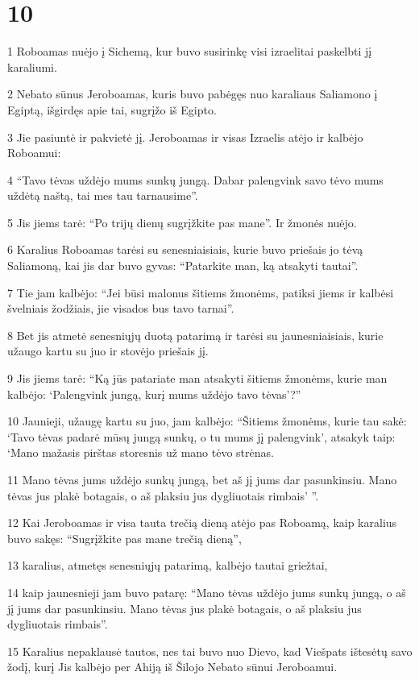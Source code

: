 \chapter{10}


\par 1 Roboamas nuėjo į Sichemą, kur buvo susirinkę visi izraelitai paskelbti jį karaliumi. 
\par 2 Nebato sūnus Jeroboamas, kuris buvo pabėgęs nuo karaliaus Saliamono į Egiptą, išgirdęs apie tai, sugrįžo iš Egipto. 
\par 3 Jie pasiuntė ir pakvietė jį. Jeroboamas ir visas Izraelis atėjo ir kalbėjo Roboamui: 
\par 4 “Tavo tėvas uždėjo mums sunkų jungą. Dabar palengvink savo tėvo mums uždėtą naštą, tai mes tau tarnausime”. 
\par 5 Jis jiems tarė: “Po trijų dienų sugrįžkite pas mane”. Ir žmonės nuėjo. 
\par 6 Karalius Roboamas tarėsi su senesniaisiais, kurie buvo priešais jo tėvą Saliamoną, kai jis dar buvo gyvas: “Patarkite man, ką atsakyti tautai”. 
\par 7 Tie jam kalbėjo: “Jei būsi malonus šitiems žmonėms, patiksi jiems ir kalbėsi švelniais žodžiais, jie visados bus tavo tarnai”. 
\par 8 Bet jis atmetė senesniųjų duotą patarimą ir tarėsi su jaunesniaisiais, kurie užaugo kartu su juo ir stovėjo priešais jį. 
\par 9 Jis jiems tarė: “Ką jūs patariate man atsakyti šitiems žmonėms, kurie man kalbėjo: ‘Palengvink jungą, kurį mums uždėjo tavo tėvas’?” 
\par 10 Jaunieji, užaugę kartu su juo, jam kalbėjo: “Šitiems žmonėms, kurie tau sakė: ‘Tavo tėvas padarė mūsų jungą sunkų, o tu mums jį palengvink’, atsakyk taip: ‘Mano mažasis pirštas storesnis už mano tėvo strėnas. 
\par 11 Mano tėvas jums uždėjo sunkų jungą, bet aš jį jums dar pasunkinsiu. Mano tėvas jus plakė botagais, o aš plaksiu jus dygliuotais rimbais’ ”. 
\par 12 Kai Jeroboamas ir visa tauta trečią dieną atėjo pas Roboamą, kaip karalius buvo sakęs: “Sugrįžkite pas mane trečią dieną”, 
\par 13 karalius, atmetęs senesniųjų patarimą, kalbėjo tautai griežtai, 
\par 14 kaip jaunesnieji jam buvo patarę: “Mano tėvas uždėjo jums sunkų jungą, o aš jį jums dar pasunkinsiu. Mano tėvas jus plakė botagais, o aš plaksiu jus dygliuotais rimbais”. 
\par 15 Karalius nepaklausė tautos, nes tai buvo nuo Dievo, kad Viešpats ištesėtų savo žodį, kurį Jis kalbėjo per Ahiją iš Šilojo Nebato sūnui Jeroboamui. 

